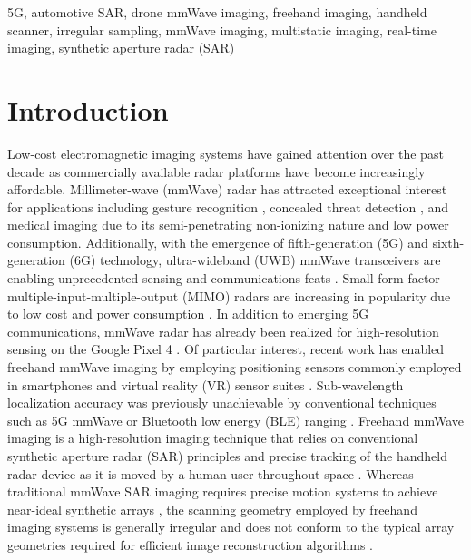 \documentclass{ieeeaccess}
\begin{document}
\begin{keywords}
5G, automotive SAR, drone mmWave imaging, freehand imaging, handheld scanner, irregular sampling, mmWave imaging, multistatic imaging, real-time imaging, synthetic aperture radar (SAR)
\end{keywords}

\titlepgskip=-15pt

\maketitle

\section{Introduction}
\label{sec:introduction}
Low-cost electromagnetic imaging systems have gained attention over the past decade as commercially available radar platforms have become increasingly affordable. 
Millimeter-wave (mmWave) radar has attracted exceptional interest for applications including gesture recognition \cite{smith2021sterile}, concealed threat detection \cite{sheen2016three,yanik2019near}, and medical imaging \cite{chao2012millimeter,gao2016millimeter} due to its semi-penetrating non-ionizing nature and low power consumption. 
Additionally, with the emergence of fifth-generation (5G) and sixth-generation (6G) technology, ultra-wideband (UWB) mmWave transceivers are enabling unprecedented sensing and communications feats \cite{li2021Integrated,alvarez2021towards,basrawi2021reverse}.
Small form-factor multiple-input-multiple-output (MIMO) radars are increasing in popularity due to low cost and power consumption \cite{smith2021An,yanik2019near}. 
In addition to emerging 5G communications, mmWave radar has already been realized for high-resolution sensing on the Google Pixel 4 \cite{basrawi2021reverse}.
Of particular interest, recent work has enabled freehand mmWave imaging by employing positioning sensors commonly employed in smartphones and virtual reality (VR) sensor suites \cite{alvarez2021towards,alvarez2019freehand,alvarez2021freehand,alvarez2021freehandsystem,alvarez2021system}.
Sub-wavelength localization accuracy was previously unachievable by conventional techniques such as 5G mmWave \cite{wymeersch2017mmWavePositioning} or Bluetooth low energy (BLE) ranging \cite{hajiakhondi2020bluetooth}.
Freehand mmWave imaging is a high-resolution imaging technique that relies on conventional synthetic aperture radar (SAR) principles \cite{smith2020nearfieldisar,yanik2019sparse,yanik2019cascaded,lopez20003,yanik2020development} and precise tracking of the handheld radar device as it is moved by a human user throughout space \cite{alvarez2021towards,baumgartner2017sononet,blackall2005alignment,gilbertson2015force}.
Whereas traditional mmWave SAR imaging requires precise motion systems to achieve near-ideal synthetic arrays \cite{yanik2020development}, the scanning geometry employed by freehand imaging systems is generally irregular and does not conform to the typical array geometries required for efficient image reconstruction algorithms \cite{smith2022ThzToolbox}.
\end{document}
